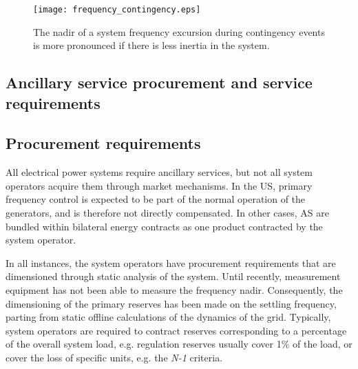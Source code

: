 \begin{figure}[htbp!]
\centering
\texttt{[image: frequency\_contingency.eps]}
\caption{The nadir of a system frequency excursion during contingency events is more pronounced if there is less inertia in the system.}
\label{fig:contingency}
\end{figure}

\subsection{Ancillary service procurement and service  requirements}\label{sec:procurement}

\subsection*{Procurement requirements}
All electrical power systems require ancillary services, but not all system operators acquire them through market mechanisms. In the US, primary frequency control is expected to be part of the normal operation of the generators, and is therefore not directly compensated. In other cases, AS are bundled within bilateral energy contracts as one product contracted by the system operator.

In all instances, the system operators have procurement requirements that are dimensioned through static analysis of the system. Until recently, measurement equipment has not been able to measure the frequency nadir\cite{eto2010use}. Consequently, the dimensioning of the primary reserves has been made on the settling frequency, parting from static offline calculations of the dynamics of the grid. Typically, system operators are required to contract reserves corresponding to a percentage of the overall system load, e.g. regulation reserves usually cover 1\% of the load, or cover the loss of specific units, e.g. the \emph{N-1} criteria.



